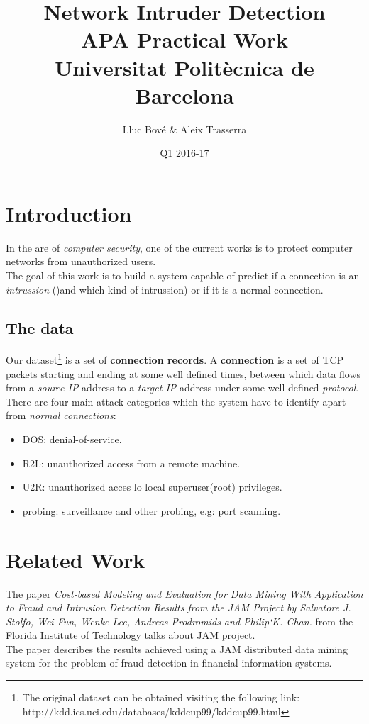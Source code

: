 \documentclass[a4paper]{article} %
\title{Network Intruder Detection \\
\large APA Practical Work \\
Universitat Politècnica de Barcelona} %
\author{Lluc Bové \& Aleix Trasserra} %
\date{Q1 2016-17}
\begin{document}
\maketitle %



\section{Introduction}
In the are of \textit{computer security}, one of the current works is to protect computer networks from unauthorized users. \\
The goal of this work is to build a system capable of predict if a connection is an \textit{intrussion} ()and which kind of intrussion) or if it is a normal connection.  
\subsection{The data}
Our dataset\footnote{The original dataset can be obtained visiting the following link:\\  http://kdd.ics.uci.edu/databases/kddcup99/kddcup99.html} is a set of \textbf{connection records}.
A \textbf{connection} is a set of TCP packets starting and ending at some well defined times, between which data flows from a \textit{source IP} address to a \textit{target IP} address under some well defined \textit{protocol}.
There are four main attack categories which the system have to identify apart from \textit{normal connections}:
\begin{itemize}
	\item DOS: denial-of-service.
	\item R2L: unauthorized access from a remote machine.
	\item U2R: unauthorized acces lo local superuser(root) privileges.
	\item probing: surveillance and other probing, e.g: port scanning.
\end{itemize}



\section{Related Work}
The paper \textit{Cost-based Modeling and Evaluation for Data Mining With Application to Fraud and Intrusion Detection Results from the JAM Project by Salvatore J. Stolfo, Wei Fun, Wenke Lee, Andreas Prodromids and Philip`K. Chan.} from the Florida Institute of Technology talks about JAM project. \\
The paper describes the results achieved using a JAM distributed data mining system for the problem of fraud detection in financial information systems. \\
\end{document}
